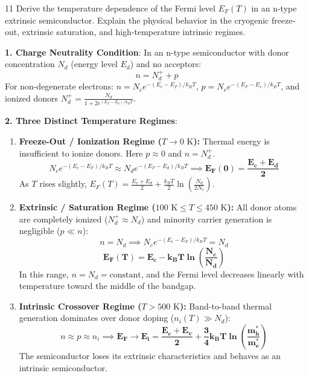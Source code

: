 \begin{theoryq}{11}
Derive the temperature dependence of the Fermi level $E_F(T)$ in an n-type extrinsic semiconductor. Explain the physical behavior in the cryogenic freeze-out, extrinsic saturation, and high-temperature intrinsic regimes.
\end{theoryq}
\begin{theorysol}
\textbf{1. Charge Neutrality Condition}:
In an n-type semiconductor with donor concentration $N_d$ (energy level $E_d$) and no acceptors:
\begin{equation}
n = N_d^+ + p
\end{equation}
For non-degenerate electrons: $n = N_c e^{-(E_c - E_F)/k_B T}$, $p = N_v e^{-(E_F - E_v)/k_B T}$, and ionized donors $N_d^+ = \frac{N_d}{1 + 2 e^{(E_F - E_d)/k_B T}}$.

\textbf{2. Three Distinct Temperature Regimes}:
\begin{enumerate}
\item \textbf{Freeze-Out / Ionization Regime ($T \to 0\text{ K}$):}
Thermal energy is insufficient to ionize donors. Here $p \approx 0$ and $n = N_d^+$.
\begin{equation}
N_c e^{-(E_c - E_F)/k_B T} \approx N_d e^{-(E_F - E_d)/k_B T} \implies \mathbf{E_F(0) = \frac{E_c + E_d}{2}}
\end{equation}
As $T$ rises slightly, $E_F(T) = \frac{E_c + E_d}{2} + \frac{k_B T}{2}\ln\left(\frac{N_d}{2 N_c}\right)$.

\item \textbf{Extrinsic / Saturation Regime ($100\text{ K} \le T \le 450\text{ K}$):}
All donor atoms are completely ionized ($N_d^+ \approx N_d$) and minority carrier generation is negligible ($p \ll n$):
\begin{equation}
n = N_d \implies N_c e^{-(E_c - E_F)/k_B T} = N_d
\end{equation}
\begin{equation}
\mathbf{E_F(T) = E_c - k_B T \ln\left(\frac{N_c}{N_d}\right)}
\end{equation}
In this range, $n = N_d = \text{constant}$, and the Fermi level decreases linearly with temperature toward the middle of the bandgap.

\item \textbf{Intrinsic Crossover Regime ($T > 500\text{ K}$):}
Band-to-band thermal generation dominates over donor doping ($n_i(T) \gg N_d$):
\begin{equation}
n \approx p \approx n_i \implies \mathbf{E_F \to E_i = \frac{E_c + E_v}{2} + \frac{3}{4}k_B T \ln\left(\frac{m_h^*}{m_e^*}\right)}
\end{equation}
The semiconductor loses its extrinsic characteristics and behaves as an intrinsic semiconductor.
\end{enumerate}
\end{theorysol}
\vspace{4mm}

